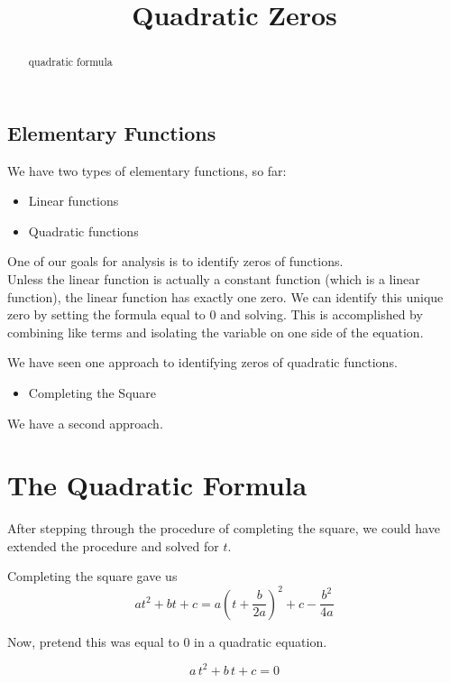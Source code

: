 \documentclass{ximera}
\title{Quadratic Zeros}
\begin{document}
\begin{abstract}
quadratic formula
\end{abstract}
\maketitle



\subsection{Elementary Functions}

We have two types of elementary functions, so far:

\begin{itemize}
\item Linear functions
\item Quadratic functions
\end{itemize}

One of our goals for analysis is to identify zeros of functions. \\

Unless the linear function is actually a constant function (which is a linear function), the linear function has exactly one zero. We can identify this unique zero by setting the formula equal to $0$ and solving.  This is accomplished by combining like terms and isolating the variable on one side of the equation.

We have seen one approach to identifying zeros of quadratic functions.
\begin{itemize}
\item Completing the Square
\end{itemize}

We have a second approach. \\




\section{The Quadratic Formula}


After stepping through the procedure of completing the square, we could have extended the procedure and solved for $t$.


Completing the square gave us 
\[ a t^2 + b t + c = a \left(t + \frac{b}{2 a} \right)^2 + c - \frac{b^2}{4 a} \]


Now, pretend this was equal to $0$ in a quadratic equation.


\[ a \, t^2 + b \, t + c = 0 \]
\end{document}
